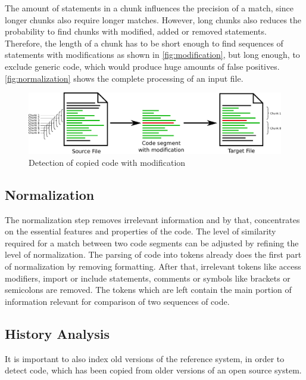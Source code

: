 The amount of statements in a chunk influences the precision of a match, since longer chunks also require longer matches.
However, long chunks also reduces the probability to find chunks with modified, added or removed statements.
Therefore, the length of a chunk has to be short enough to find sequences of statements with modifications as shown in \autoref{fig:modification}, but long enough, to exclude generic code, which would produce huge amounts of false positives.
\autoref{fig:normalization} shows the complete processing of an input file.

\begin{figure}[h]
	\centering
	\includegraphics[width=\linewidth]{figures/modification.pdf}
	\caption{Detection of copied code with modification}\label{fig:modification}
\end{figure}

\subsection{Normalization}\label{section:approach/creating_index/normalization}
The normalization step removes irrelevant information and by that, concentrates on the essential features and properties of the code.
The level of similarity required for a match between two code segments can be adjusted by refining the level of normalization.
The parsing of code into tokens already does the first part of normalization by removing formatting.
After that, irrelevant tokens like access modifiers, import or include statements, comments or symbols like brackets or semicolons are removed.
The tokens which are left contain the main portion of information relevant for comparison of two sequences of code.

\subsection{History Analysis}\label{section:approach/creating_index/history_analysis}
It is important to also index old versions of the reference system, in order to detect code, which has been copied from older versions of an open source system.

